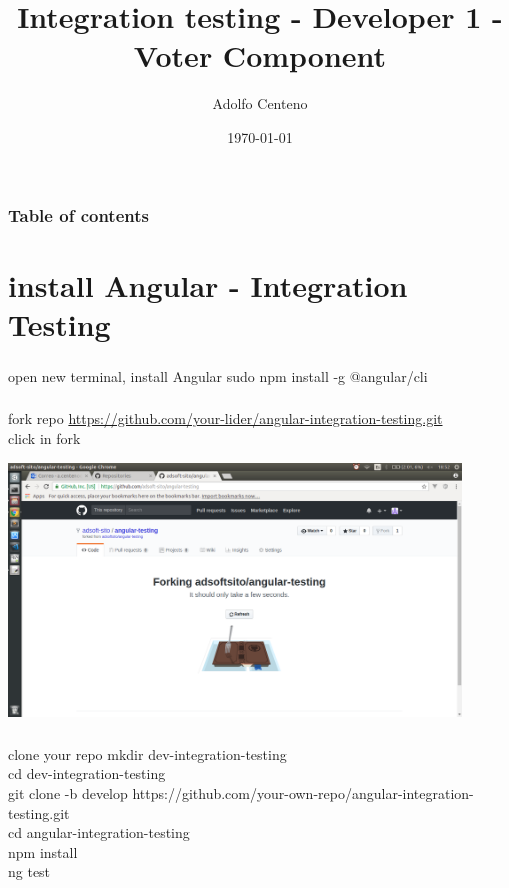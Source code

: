 \documentclass{beamer}
\begin{document}
\title{Integration testing - Developer 1 - Voter Component}  
\author{Adolfo Centeno}
\date{\today} 

\begin{frame}
\titlepage
\end{frame}

\begin{frame}\frametitle{Table of contents}\tableofcontents
\end{frame} 


\section{install Angular - Integration Testing} 

\begin{frame}\frametitle{} 


\begin{block}{open new terminal, install Angular}
sudo npm install -g @angular/cli
\end{block}

\end{frame}


\begin{frame}\frametitle{} 

\begin{block}{fork repo}
\url{https://github.com/your-lider/angular-integration-testing.git} \\
click in fork
\end{block}

\begin{center}
\includegraphics[width=0.9\textwidth]{forking.png}
\end{center}

\end{frame}




\begin{frame}\frametitle{} 

\begin{block}{clone your repo}
mkdir dev-integration-testing \\
cd dev-integration-testing	 \\
git clone -b develop https://github.com/your-own-repo/angular-integration-testing.git \\
cd angular-integration-testing \\
npm install \\
ng test   
\end{block}

\end{frame}
\end{document}

